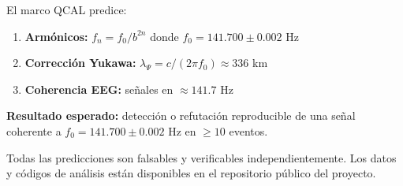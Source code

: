El marco QCAL predice:

\begin{enumerate}
  \item \textbf{Armónicos:} $f_n = f_0/b^{2n}$ donde $f_0 = 141.700 \pm 0.002$ Hz
  \item \textbf{Corrección Yukawa:} $\lambda_\Psi = c/(2\pi f_0) \approx 336$ km
  \item \textbf{Coherencia EEG:} señales en $\approx 141.7$ Hz
\end{enumerate}

\textbf{Resultado esperado:} detección o refutación reproducible de una señal coherente a 
$f_0 = 141.700 \pm 0.002$ Hz en $\geq 10$ eventos.

\begin{remark}
Todas las predicciones son falsables y verificables independientemente. Los datos y códigos de análisis están disponibles en el repositorio público del proyecto.
\end{remark}
